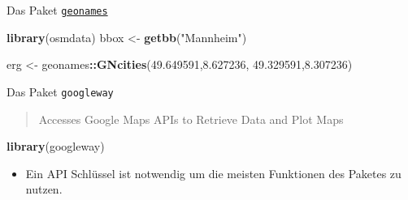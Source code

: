 \documentclass[ignorenonframetext,]{beamer}
\newenvironment{Shaded}{\begin{snugshade}}{\end{snugshade}}
\newcommand{\FloatTok}[1]{\textcolor[rgb]{0.00,0.00,0.81}{#1}}
\newcommand{\KeywordTok}[1]{\textcolor[rgb]{0.13,0.29,0.53}{\textbf{#1}}}
\newcommand{\NormalTok}[1]{#1}
\newcommand{\OperatorTok}[1]{\textcolor[rgb]{0.81,0.36,0.00}{\textbf{#1}}}
\newcommand{\StringTok}[1]{\textcolor[rgb]{0.31,0.60,0.02}{#1}}
\providecommand{\tightlist}{%
  \setlength{\itemsep}{0pt}\setlength{\parskip}{0pt}}
\begin{document}
\begin{frame}[fragile]{Das Paket
\href{https://github.com/ropensci/geonames}{\texttt{geonames}}}
\begin{Shaded}
\begin{Highlighting}[]
\KeywordTok{library}\NormalTok{(osmdata)}
\NormalTok{bbox <-}\StringTok{ }\KeywordTok{getbb}\NormalTok{(}\StringTok{"Mannheim"}\NormalTok{)}
\end{Highlighting}
\end{Shaded}

\begin{Shaded}
\begin{Highlighting}[]
\NormalTok{erg <-}\StringTok{ }\NormalTok{geonames}\OperatorTok{::}\KeywordTok{GNcities}\NormalTok{(}\FloatTok{49.649591}\NormalTok{,}\FloatTok{8.627236}\NormalTok{,}
                          \FloatTok{49.329591}\NormalTok{,}\FloatTok{8.307236}\NormalTok{)}
\end{Highlighting}
\end{Shaded}

\end{frame}

\begin{frame}[fragile]{Das Paket \texttt{googleway}}
\protect\hypertarget{das-paket-googleway}{}

\begin{quote}
Accesses Google Maps APIs to Retrieve Data and Plot Maps
\end{quote}

\begin{Shaded}
\begin{Highlighting}[]
\KeywordTok{library}\NormalTok{(googleway)}
\end{Highlighting}
\end{Shaded}

\begin{itemize}
\tightlist
\item
  Ein API Schlüssel ist notwendig um die meisten Funktionen des Paketes
  zu nutzen.
\end{itemize}

\end{frame}
\end{document}
